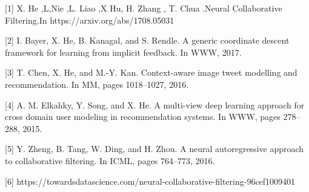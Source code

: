 \documentclass[sigconf]{acmart}
\begin{document}
\balance

[1] X.  He ,L,Nie ,L. Liao ,X Hu, H. Zhang , T. Chua .Neural Collaborative Filtering.In https://arxiv.org/abs/1708.05031

[2] I. Bayer, X. He, B. Kanagal, and S. Rendle. A generic coordinate descent framework for learning from implicit feedback. In WWW, 2017.

[3] T. Chen, X. He, and M.-Y. Kan. Context-aware image tweet modelling and recommendation. In MM, pages 1018–1027, 2016.

[4] A. M. Elkahky, Y. Song, and X. He. A multi-view deep learning approach for cross domain user modeling in recommendation systems. In WWW, pages 278–288, 2015.

[5] Y. Zheng, B. Tang, W. Ding, and H. Zhou. A neural autoregressive approach to collaborative filtering. In ICML, pages 764–773, 2016.

[6] https://towardsdatascience.com/neural-collaborative-filtering-96cef1009401
\end{document}
